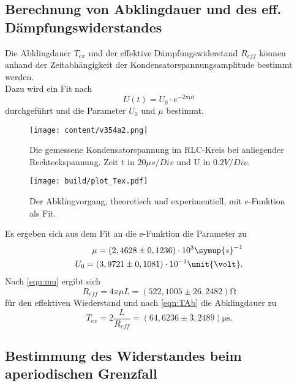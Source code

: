 \subsection{Berechnung von Abklingdauer und des eff. Dämpfungswiderstandes}
\label{subsec:Abklingdauer und R_daempf}

Die Abklingdauer $T_{ex}$ und der effektive Dämpfungswiderstand $R_{eff}$ können anhand der Zeitabhängigkeit der Kondensatorspannungsamplitude 
bestimmt werden.\\

\noindent Dazu wird ein Fit nach
\begin{equation*}
    U(t) = U_0 \cdot e^{-2\pi\mu t}
\end{equation*}
durchgeführt und die Parameter $U_0$ und $\mu$ bestimmt.\\

\begin{figure}[H]
  \centering
  \texttt{[image: content/v354a2.png]}
  \caption{Die gemessene Kondensatorspannung im RLC-Kreis bei anliegender Rechteckspannung. Zeit t in $20\mu s/Div$ und U in $0.2V/Div$.}
  \label{fig:MessApp}
\end{figure}



\begin{figure}[H]
  \centering
  \texttt{[image: build/plot\_Tex.pdf]}
  \caption{Der Abklingvorgang, theoretisch und experimentiell, mit e-Funktion als Fit.}
  \label{fig:plot_abklingdauer}
\end{figure}

\noindent Es ergeben sich aus dem Fit an die e-Funktion die Parameter zu
\begin{align*}
  \mu = (2,4628\pm 0,1236)\cdot 10^3 \symup{s}^{-1} \\
  U_0 = (3,9721\pm 0,1081)\cdot 10^{-1} \unit{\volt}.
\end{align*}
Nach \eqref{eqn:mu} ergibt sich
\begin{equation*}
  R_{eff} = 4\pi\mu L = (522,1005\pm 26,2482)\unit{\ohm}
\end{equation*}
für den effektiven Wiederstand und nach \eqref{eqn:TAb} die Abklingdauer zu
\begin{equation*}
  T_{ex} = 2\frac{L}{R_{eff}} = (64,6236\pm 3,2489)\unit{\micro\second}.
\end{equation*}




\subsection{Bestimmung des Widerstandes beim aperiodischen Grenzfall}
\label{R_ap}

